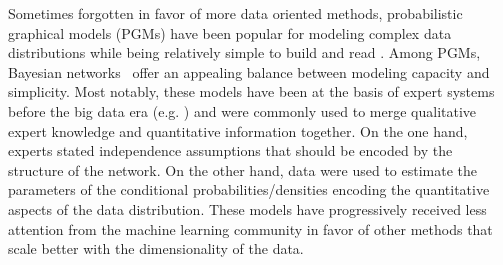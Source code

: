 Sometimes forgotten in favor of more data oriented methods, probabilistic graphical models (PGMs) have been popular for modeling complex data distributions while being relatively simple to build and read \citep{PGM-book, johnson2016composing}. Among PGMs, Bayesian networks~\citep[BNs, ][]{Pearl-BN} offer an appealing balance between modeling capacity and simplicity. Most notably, these models have been at the basis of expert systems before the big data era (e.g. \citep{BN-app-1, BN-app-2, BN-app-3}) and were commonly used to merge qualitative expert knowledge and quantitative information together. On the one hand, experts stated independence assumptions that should be encoded by the structure of the network. On the other hand, data were used to estimate the parameters of the conditional probabilities/densities encoding the quantitative aspects of the data distribution. %
These models have progressively received less attention from the machine learning community in favor of other methods that scale better with the dimensionality of the data. %

